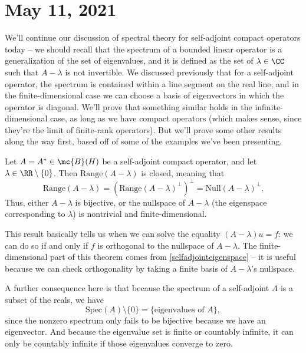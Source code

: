 
\pagebreak\section*{May 11, 2021}

We'll continue our discussion of spectral theory for self-adjoint compact operators today -- we should recall that the spectrum of a bounded linear operator is a generalization of the set of eigenvalues, and it is defined as the set of $\lambda \in \CC$ such that $A - \lambda$ is not invertible. We discussed previously that for a self-adjoint operator, the spectrum is contained within a line segment on the real line, and in the finite-dimensional case we can choose a basis of eigenvectors in which the operator is diagonal. We'll prove that something similar holds in the infinite-dimensional case, as long as we have compact operators (which makes sense, since they're the limit of finite-rank operators). But we'll prove some other results along the way first, based off of some of the examples we've been presenting.

\begin{theorem}
Let $A = A^\ast \in \mc{B}(H)$ be a self-adjoint compact operator, and let $\lambda \in \RR \setminus \{0\}$. Then $\text{Range}(A - \lambda)$ is closed, meaning that
\[
    \text{Range}(A - \lambda) = (\text{Range}(A-\lambda)^\perp)^\perp = \text{Null}(A - \lambda)^\perp.
\]
Thus, either $A - \lambda$ is bijective, or the nullspace of $A - \lambda$ (the eigenspace corresponding to $\lambda$) is nontrivial and finite-dimensional.
\end{theorem}

This result basically tells us when we can solve the equality $(A - \lambda)u = f$: we can do so if and only if $f$ is orthogonal to the nullspace of $A - \lambda$. The finite-dimensional part of this theorem comes from \cref{selfadjointeigenspace} -- it is useful because we can check orthogonality by taking a finite basis of $A - \lambda$'s nullspace. 

A further consequence here is that because the spectrum of a self-adjoint $A$ is a subset of the reals, we have
\[
    \text{Spec}(A) \setminus \{0\} = \{\text{eigenvalues of }A\},
\]
since the nonzero spectrum only fails to be bijective because we have an eigenvector. And because the eigenvalue set is finite or countably infinite, it can only be countably infinite if those eigenvalues converge to zero. 

